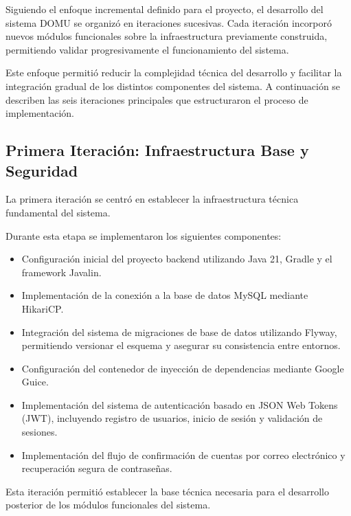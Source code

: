 Siguiendo el enfoque incremental definido para el proyecto, el desarrollo del sistema DOMU se organizó en iteraciones sucesivas. Cada iteración incorporó nuevos módulos funcionales sobre la infraestructura previamente construida, permitiendo validar progresivamente el funcionamiento del sistema.

Este enfoque permitió reducir la complejidad técnica del desarrollo y facilitar la integración gradual de los distintos componentes del sistema. A continuación se describen las seis iteraciones principales que estructuraron el proceso de implementación.

\subsection{Primera Iteración: Infraestructura Base y Seguridad}

La primera iteración se centró en establecer la infraestructura técnica fundamental del sistema.

Durante esta etapa se implementaron los siguientes componentes:

\begin{itemize}

\item Configuración inicial del proyecto backend utilizando Java 21, Gradle y el framework Javalin.

\item Implementación de la conexión a la base de datos MySQL mediante HikariCP.

\item Integración del sistema de migraciones de base de datos utilizando Flyway, permitiendo versionar el esquema y asegurar su consistencia entre entornos.

\item Configuración del contenedor de inyección de dependencias mediante Google Guice.

\item Implementación del sistema de autenticación basado en JSON Web Tokens (JWT), incluyendo registro de usuarios, inicio de sesión y validación de sesiones.

\item Implementación del flujo de confirmación de cuentas por correo electrónico y recuperación segura de contraseñas.

\end{itemize}

Esta iteración permitió establecer la base técnica necesaria para el desarrollo posterior de los módulos funcionales del sistema.

